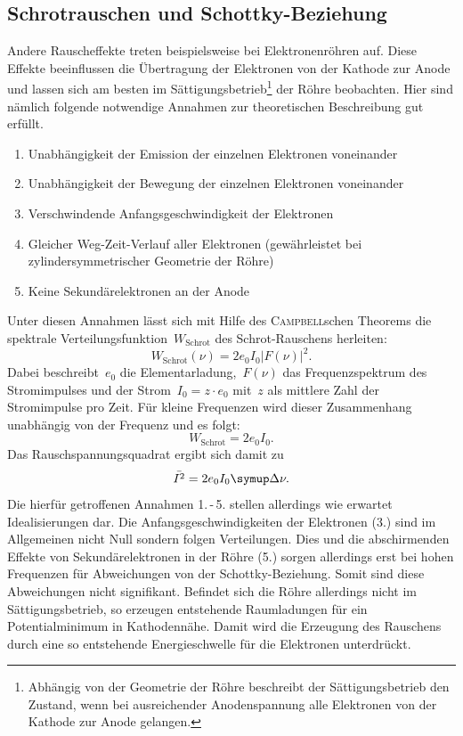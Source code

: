 \subsection{Schrotrauschen und Schottky-Beziehung}
%
Andere Rauscheffekte treten beispielsweise bei Elektronenröhren auf. Diese
Effekte beeinflussen die Übertragung der Elektronen von der Kathode zur Anode
und lassen sich am besten im Sättigungsbetrieb\footnote{Abhängig von der
Geometrie der Röhre beschreibt der Sättigungsbetrieb den Zustand, wenn bei
ausreichender Anodenspannung alle Elektronen von der Kathode zur Anode
gelangen.} der Röhre beobachten. Hier sind nämlich folgende notwendige Annahmen
zur theoretischen Beschreibung gut erfüllt.
%
\begin{enumerate}
  \item Unabhängigkeit der Emission der einzelnen Elektronen voneinander
  \item Unabhängigkeit der Bewegung der einzelnen Elektronen voneinander
  \item Verschwindende Anfangsgeschwindigkeit der Elektronen
  \item Gleicher Weg-Zeit-Verlauf aller Elektronen (gewährleistet bei
  zylindersymmetrischer Geometrie der Röhre)
  \item Keine Sekundärelektronen an der Anode
\end{enumerate}
%
Unter diesen Annahmen lässt sich mit Hilfe des \textsc{Campbell}schen Theorems
die spektrale Verteilungsfunktion~$W_\text{Schrot}$ des Schrot-Rauschens herleiten:
%
\begin{equation}
  W_\text{Schrot}(\nu)=2e_0I_0\left\vert F(\nu)\right\vert^2.
\end{equation}
%
Dabei beschreibt~$e_0$ die Elementarladung,~$F(\nu)$ das
Frequenzspektrum des Stromimpulses und der Strom~$I_0=z\cdot e_0$
mit~$z$ als mittlere Zahl der Stromimpulse pro Zeit. Für kleine Frequenzen wird
dieser Zusammenhang unabhängig von der Frequenz und es folgt:
%
\begin{equation}
  W_\text{Schrot}=2e_0I_0.
\end{equation}
%
Das Rauschspannungsquadrat ergibt sich damit zu
%
\begin{equation}
  \bar{I^2}=2e_0I_0\upD\nu.
  \label{eq:schottky}
\end{equation}
%
Die hierfür getroffenen Annahmen 1.\,-\,5. stellen allerdings wie erwartet
Idealisierungen dar. Die Anfangsgeschwindigkeiten der Elektronen (3.) sind im
Allgemeinen nicht Null sondern folgen Verteilungen. Dies und die abschirmenden
Effekte von Sekundärelektronen in der Röhre (5.) sorgen allerdings erst bei
hohen Frequenzen für Abweichungen von der Schottky-Beziehung. Somit sind diese
Abweichungen nicht signifikant. Befindet sich die Röhre allerdings nicht im
Sättigungsbetrieb, so erzeugen entstehende Raumladungen für ein Potentialminimum
in Kathodennähe. Damit wird die Erzeugung des Rauschens durch eine so
entstehende Energieschwelle für die Elektronen unterdrückt.

